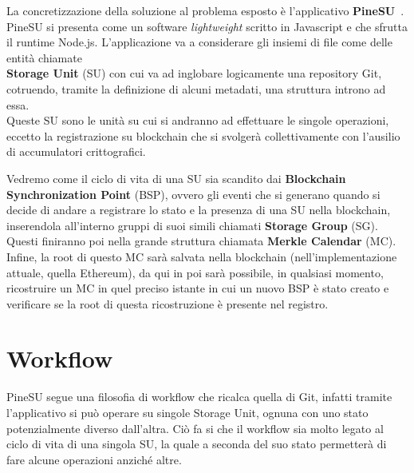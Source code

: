 
La concretizzazione della soluzione al problema esposto è l’applicativo \textbf{PineSU}~\cite{pinesu-github-21}. \\
PineSU si presenta come un software \emph{lightweight} scritto in Javascript e che sfrutta il runtime Node.js.
L’applicazione va a considerare gli insiemi di file come delle entità chiamate \\
\textbf{Storage Unit} (SU) con cui va ad inglobare logicamente una repository Git, cotruendo,
tramite la definizione di alcuni metadati, una struttura introno ad essa. \\
Queste SU sono le unità su cui si andranno ad effettuare le singole
operazioni, eccetto la registrazione su blockchain che si svolgerà collettivamente con l’ausilio di accumulatori crittografici. 

Vedremo come il ciclo di vita di una SU sia scandito dai \textbf{Blockchain Synchronization Point} (BSP),
ovvero gli eventi che si generano quando si decide di andare a registrare lo stato e la presenza di una SU nella blockchain, inserendola
all’interno gruppi di suoi simili chiamati \textbf{Storage Group} (SG). Questi finiranno poi nella grande struttura chiamata \textbf{Merkle Calendar} (MC).
Infine, la root di questo MC sarà salvata nella blockchain (nell’implementazione attuale, quella Ethereum), da qui in poi sarà possibile, in qualsiasi momento, ricostruire un MC in quel preciso istante in cui un nuovo BSP è stato creato e verificare se la root di questa ricostruzione è presente nel registro.

\section{Workflow}
\label{sec:work}

PineSU segue una filosofia di workflow che ricalca quella di Git,
infatti tramite l’applicativo si può operare su singole Storage Unit, ognuna con uno stato potenzialmente
diverso dall’altra. Ciò fa si che il workflow sia molto legato al ciclo di vita di una singola SU, la quale
a seconda del suo stato permetterà di fare alcune operazioni anziché altre.

